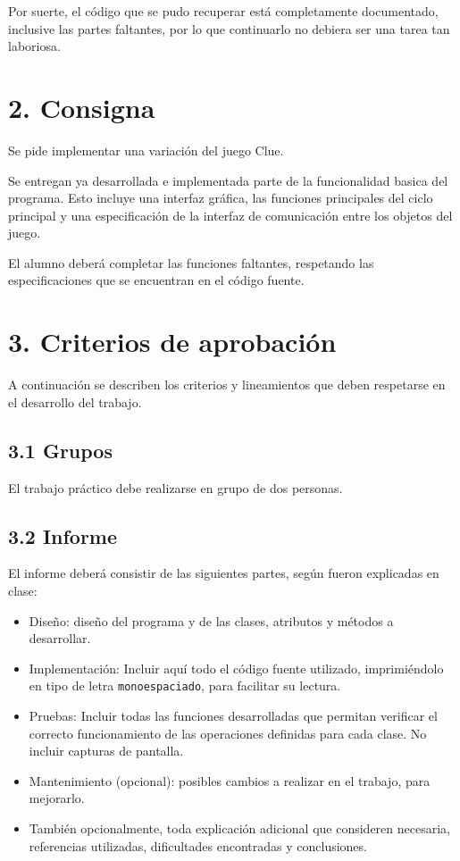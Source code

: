 \documentclass[12pt,spanish,]{article}
\begin{document}
Por suerte, el código que se pudo recuperar está completamente
documentado, inclusive las partes faltantes, por lo que continuarlo no
debiera ser una tarea tan laboriosa.

\section{2. Consigna}\label{consigna}

Se pide implementar una variación del juego Clue.

Se entregan ya desarrollada e implementada parte de la funcionalidad
basica del programa. Esto incluye una interfaz gráfica, las funciones
principales del ciclo principal y una especificación de la interfaz de
comunicación entre los objetos del juego.

El alumno deberá completar las funciones faltantes, respetando las
especificaciones que se encuentran en el código fuente.

\newpage

\section{3. Criterios de aprobación}\label{criterios-de-aprobaciuxf3n}

A continuación se describen los criterios y lineamientos que deben
respetarse en el desarrollo del trabajo.

\subsection{3.1 Grupos}\label{grupos}

El trabajo práctico debe realizarse en grupo de dos personas.

\subsection{3.2 Informe}\label{informe}

El informe deberá consistir de las siguientes partes, según fueron
explicadas en clase:

\begin{itemize}
\item
  Diseño: diseño del programa y de las clases, atributos y métodos a
  desarrollar.
\item
  Implementación: Incluir aquí todo el código fuente utilizado,
  imprimiéndolo en tipo de letra \texttt{monoespaciado}, para facilitar
  su lectura.
\item
  Pruebas: Incluir todas las funciones desarrolladas que permitan
  verificar el correcto funcionamiento de las operaciones definidas para
  cada clase. No incluir capturas de pantalla.
\item
  Mantenimiento (opcional): posibles cambios a realizar en el trabajo,
  para mejorarlo.
\item
  También opcionalmente, toda explicación adicional que consideren
  necesaria, referencias utilizadas, dificultades encontradas y
  conclusiones.
\end{itemize}
\end{document}
